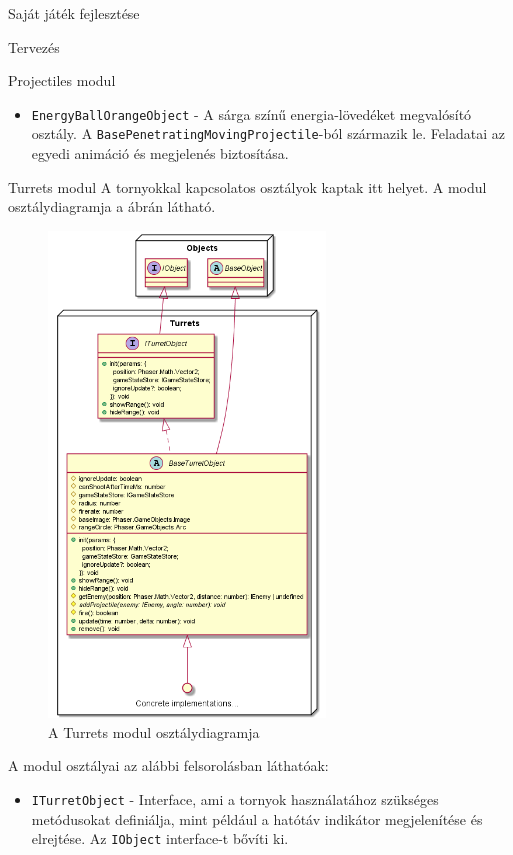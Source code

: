 \begin{MyChapter}{Saját játék fejlesztése}
\begin{MySection}{Tervezés}
\begin{MySubSection}{Projectiles modul}
\begin{itemize}
				\item \texttt{EnergyBallOrangeObject} - A sárga színű energia-lövedéket megvalósító osztály. A \texttt{Base\-Penetrating\-Moving\-Projectile}-ból származik le. Feladatai az egyedi animáció és megjelenés biztosítása.
							
			\end{itemize}
		\end{MySubSection}

		\begin{MySubSection}{Turrets modul}
			A tornyokkal kapcsolatos osztályok kaptak itt helyet.
			A modul osztálydiagramja a  ábrán látható.
			
			\begin{figure}[h!]
				\centering
				\includegraphics[width=0.656\textwidth]{kepek/uml/turrets/turret-pt1.png}
				\caption{A Turrets modul osztálydiagramja}
				\label{fig:uml:turret}
			\end{figure}
			
			A modul osztályai az alábbi felsorolásban láthatóak:
			\begin{itemize}
				\item \texttt{ITurretObject} - Interface, ami a tornyok használatához szükséges metódusokat definiálja, mint például a hatótáv indikátor megjelenítése és elrejtése. Az \texttt{IObject} interface-t bővíti ki.
				

\end{itemize}
\end{MySubSection}
\end{MySection}
\end{MyChapter}
